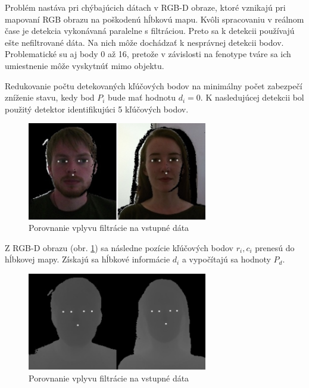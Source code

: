 Problém nastáva pri chýbajúcich dátach v RGB-D obraze, ktoré vznikajú pri mapovaní RGB obrazu na poškodenú hĺbkovú mapu. Kvôli spracovaniu v reálnom čase je detekcia vykonávaná paralelne s filtráciou. Preto sa k detekcii používajú ešte nefiltrované dáta. Na nich môže dochádzať k nesprávnej detekcii bodov. Problematické su aj body 0 až 16, pretože v závislosti na fenotype tváre sa ich umiestnenie môže vyskytnúť mimo objektu. 

Redukovanie počtu detekovaných kľúčových bodov na minimálny počet zabezpečí zníženie stavu, kedy bod $P_i$ bude mať hodnotu $d_i=0$. K nasledujúcej detekcii bol použitý detektor identifikujúci 5 kľúčových bodov. 
 
\begin{figure}[H]
	\centering
	\includegraphics[width=0.70\textwidth]{figures/rgbd_points.png}
	\caption{Porovnanie vplyvu filtrácie na vstupné dáta}
	\label{fig:dlib:rbbd5}

\end{figure}

Z RGB-D obrazu (obr. \ref{fig:dlib:rbbd5}) sa následne pozície kľúčových bodov $r_i, c_i$ prenesú do hĺbkovej mapy. Získajú sa hĺbkové informácie $d_i$ a vypočítajú sa hodnoty $P_d$. 

\begin{figure}[H]
	\centering
	\includegraphics[width=0.70\textwidth]{figures/depth_points.png}
	\caption{Porovnanie vplyvu filtrácie na vstupné dáta}
	\label{fig:dlib:depth5}
\end{figure}

